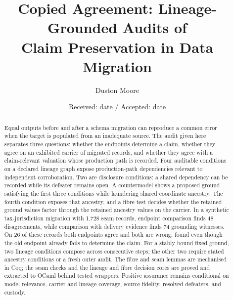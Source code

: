 \documentclass[smallextended,envcountsect,envcountsame,natbib]{svjour3}
\begin{document}
\title{Copied Agreement: Lineage-Grounded Audits of\\ Claim Preservation in Data Migration}
\author{Duston Moore}
\date{Received: date / Accepted: date}

\maketitle

\begin{abstract}
Equal outputs before and after a schema migration can reproduce a common error when the target is populated from an inadequate source. The audit given here separates three questions: whether the endpoints determine a claim, whether they agree on an exhibited carrier of migrated records, and whether they agree with a claim-relevant valuation whose production path is recorded. Four auditable conditions on a declared lineage graph expose production-path dependencies relevant to independent corroboration. Two are disclosure conditions: a shared dependency can be recorded while its defeater remains open. A countermodel shows a proposed ground satisfying the first three conditions while laundering shared coordinate ancestry. The fourth condition exposes that ancestry, and a fibre test decides whether the retained ground values factor through the retained ancestry values on the carrier. In a synthetic tax-jurisdiction migration with 1,728 seam records, endpoint comparison finds 48 disagreements, while comparison with delivery evidence finds 74 grounding witnesses. On 26 of these records both endpoints agree and both are wrong, found even though the old endpoint already fails to determine the claim. For a stably bound fixed ground, two lineage conditions compose across consecutive steps; the other two require stated ancestry conditions or a fresh outer audit. The fibre and seam lemmas are mechanised in Coq; the seam checks and the lineage and fibre decision cores are proved and extracted to OCaml behind tested wrappers. Positive assurance remains conditional on model relevance, carrier and lineage coverage, source fidelity, resolved defeaters, and custody.
\end{abstract}
\end{document}
